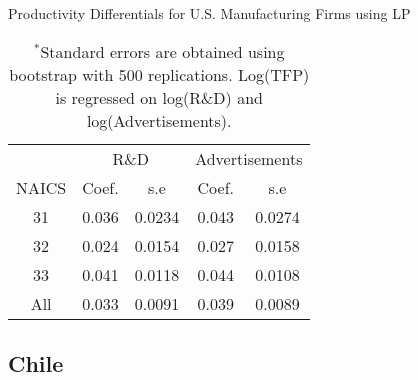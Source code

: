 \documentclass[12pt]{article}
\begin{document}
\begin{appendices}
\begin{table}[H]
\centering
\caption{Productivity Differentials for U.S. Manufacturing Firms using LP}
\small
\begin{tabular}{ccccc}
  \hline\hline & \multicolumn{2}{c}{R\&D}  & \multicolumn{2}{c}{Advertisements} \\ \cmidrule(lr){2-3} \cmidrule(lr){4-5}NAICS & Coef. & s.e & Coef. & s.e \\ 
  \hline
31 & 0.036 & 0.0234 & 0.043 & 0.0274 \\ 
  32 & 0.024 & 0.0154 & 0.027 & 0.0158 \\ 
  33 & 0.041 & 0.0118 & 0.044 & 0.0108 \\ 
  All & 0.033 & 0.0091 & 0.039 & 0.0089 \\ 
   \hline
\end{tabular}
\caption*{\footnotesize $^{*}$Standard errors are obtained using bootstrap with 500 replications. Log(TFP) is regressed on log(R\&D) and log(Advertisements).}
\label{LPUSTFPP}
\end{table}

\subsection{Chile}


\end{appendices}
\end{document}
